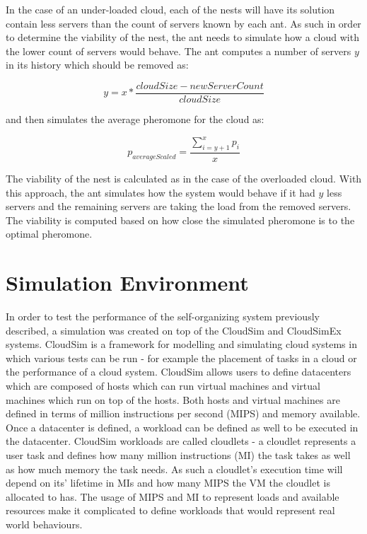 \documentclass[conference]{IEEEtran}
\begin{document}
In the case of an under-loaded cloud, each of the nests will have its solution contain less servers than the count of servers known by each ant. As such in order to determine the viability of the nest, the ant needs to simulate how a cloud with the lower count of servers would behave. The ant computes a number of servers $y$ in its history which should be removed as:

\begin{equation}
	y = x * \frac{cloudSize - newServerCount}{cloudSize}
\end{equation}

and then simulates the average pheromone for the cloud as:

\begin{equation}
	p_{averageScaled} = \frac{\sum\limits_{i=y+1}^x p_{i}}{x}
\end{equation}

The viability of the nest is calculated as in the case of the overloaded cloud. With this approach, the ant simulates how the system would behave if it had $y$ less servers and the remaining servers are taking the load from the removed servers. The viability is computed based on how close the simulated pheromone is to the optimal pheromone.

\section{Simulation Environment}
\label{sec:testbed}

In order to test the performance of the self-organizing system previously described, a simulation was created on top of the CloudSim and CloudSimEx systems. CloudSim is a framework for modelling and simulating cloud systems in which various tests can be run - for example the placement of tasks in a cloud or the performance of a cloud system. CloudSim allows users to define datacenters which are composed of hosts which can run virtual machines and virtual machines which run on top of the hosts. Both hosts and virtual machines are defined in terms of million instructions per second (MIPS) and memory available. Once a datacenter is defined, a workload can be defined as well to be executed in the datacenter. CloudSim workloads are called cloudlets - a cloudlet represents a user task and defines how many million instructions (MI) the task takes as well as how much memory the task needs. As such a cloudlet's execution time will depend on its' lifetime in MIs and how many MIPS the VM the cloudlet is allocated to has. The usage of MIPS and MI to represent loads and available resources make it complicated to define workloads that would represent real world behaviours.
\end{document}
